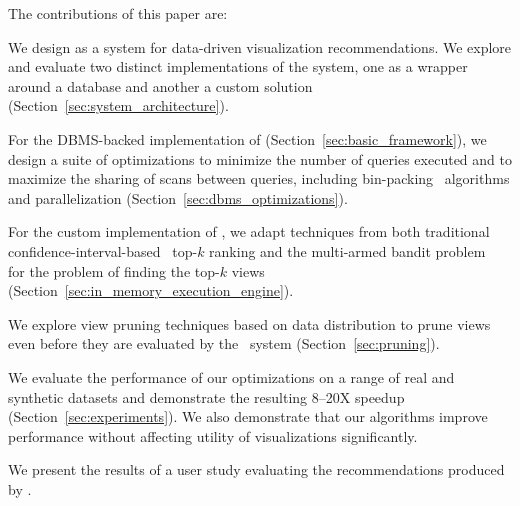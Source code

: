 The contributions of this paper are:
\begin{denselist}
  \item We design \SeeDB as a system for data-driven visualization recommendations.
  We explore and evaluate two distinct implementations of the system, one as a
  wrapper around a database and another a custom solution (Section~\ref{sec:system_architecture}).
  \item For the DBMS-backed implementation of \SeeDB (Section~\ref{sec:basic_framework}), we
  design a suite of optimizations to minimize the number of queries executed and to
  maximize the sharing of scans between queries, 
  including bin-packing~\cite{garey} algorithms and parallelization
  (Section~\ref{sec:dbms_optimizations}).
  \item For the custom implementation of \SeeDB,  we adapt techniques 
  from both traditional confidence-interval-based~\cite{hoeffding1963probability} top-$k$ ranking and the
   multi-armed bandit problem~\cite{bandits} 
   for the problem of finding the top-$k$ views (Section~\ref{sec:in_memory_execution_engine}).
  \item We explore view pruning techniques based on data distribution
  to prune views even before they are evaluated by the \SeeDB\ system 
  (Section~\ref{sec:pruning}).
  \item We evaluate the performance of our optimizations on a range of
  real and synthetic datasets and demonstrate the resulting 8--20X speedup 
  (Section~\ref{sec:experiments}). We also demonstrate that our algorithms
  improve performance without affecting utility of visualizations significantly.
  \item We present the results of a user study evaluating the recommendations produced by \SeeDB.
\end{denselist}




